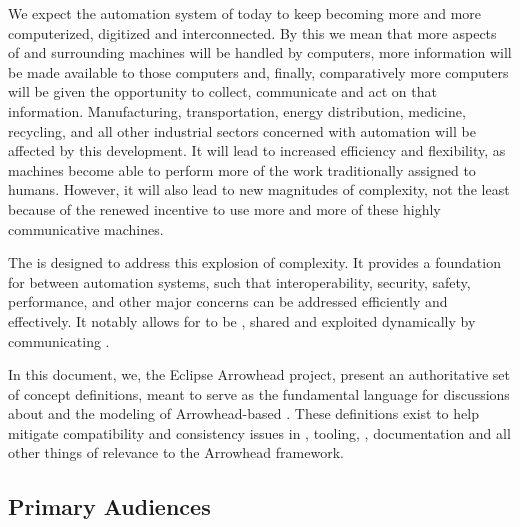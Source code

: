 %
%

We expect the automation system of today to keep becoming more and more computerized, digitized and interconnected.
By this we mean that more aspects of and surrounding machines will be handled by computers, more information will be made available to those computers and, finally, comparatively more computers will be given the opportunity to collect, communicate and act on that information.
Manufacturing, transportation, energy distribution, medicine, recycling, and all other industrial sectors concerned with automation will be affected by this development.
It will lead to increased efficiency and flexibility, as machines become able to perform more of the work traditionally assigned to humans.
However, it will also lead to new magnitudes of complexity, not the least because of the renewed incentive to use more and more of these highly communicative machines.

The  is designed to address this explosion of complexity.
It provides a foundation for  \cite{mackenzie2006reference} between automation systems, such that interoperability, security, safety, performance, and other major concerns can be addressed efficiently and effectively.
It notably allows for   to be , shared and exploited dynamically by communicating .

In this document, we, the Eclipse Arrowhead project, present an authoritative set of concept definitions, meant to serve as the fundamental language for discussions about and the modeling of Arrowhead-based .
These definitions exist to help mitigate compatibility and consistency issues in , tooling, , documentation and all other things of relevance to the Arrowhead framework.

\subsection{Primary Audiences}
\label{sec:introduction:audiences}

